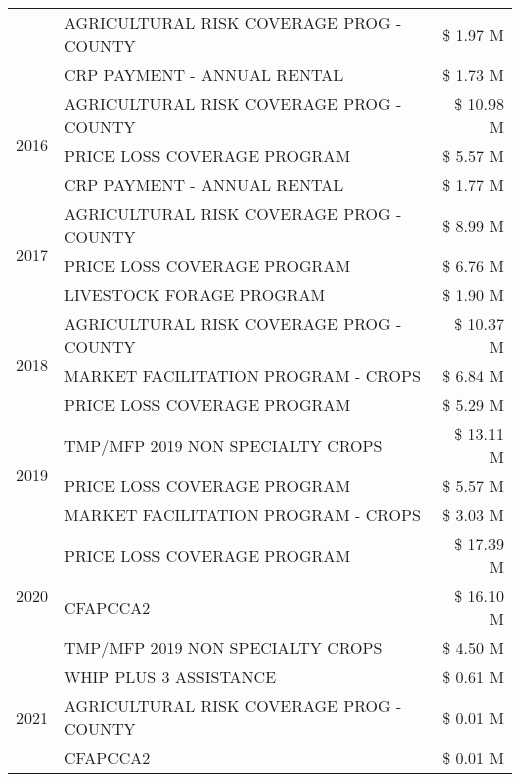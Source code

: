 \begin{tabular}{llr}
 & AGRICULTURAL RISK COVERAGE PROG - COUNTY & \$ 1.97 M \\
 & CRP PAYMENT - ANNUAL RENTAL & \$ 1.73 M \\
\cline{1-3}
\multirow[t]{3}{*}{2016} & AGRICULTURAL RISK COVERAGE PROG - COUNTY & \$ 10.98 M \\
 & PRICE LOSS COVERAGE PROGRAM & \$ 5.57 M \\
 & CRP PAYMENT - ANNUAL RENTAL & \$ 1.77 M \\
\cline{1-3}
\multirow[t]{3}{*}{2017} & AGRICULTURAL RISK COVERAGE PROG - COUNTY & \$ 8.99 M \\
 & PRICE LOSS COVERAGE PROGRAM & \$ 6.76 M \\
 & LIVESTOCK FORAGE PROGRAM & \$ 1.90 M \\
\cline{1-3}
\multirow[t]{3}{*}{2018} & AGRICULTURAL RISK COVERAGE PROG - COUNTY & \$ 10.37 M \\
 & MARKET FACILITATION PROGRAM - CROPS & \$ 6.84 M \\
 & PRICE LOSS COVERAGE PROGRAM & \$ 5.29 M \\
\cline{1-3}
\multirow[t]{3}{*}{2019} & TMP/MFP 2019 NON SPECIALTY CROPS & \$ 13.11 M \\
 & PRICE LOSS COVERAGE PROGRAM & \$ 5.57 M \\
 & MARKET FACILITATION PROGRAM - CROPS & \$ 3.03 M \\
\cline{1-3}
\multirow[t]{3}{*}{2020} & PRICE LOSS COVERAGE PROGRAM & \$ 17.39 M \\
 & CFAPCCA2 & \$ 16.10 M \\
 & TMP/MFP 2019 NON SPECIALTY CROPS & \$ 4.50 M \\
\cline{1-3}
\multirow[t]{3}{*}{2021} & WHIP PLUS 3 ASSISTANCE & \$ 0.61 M \\
 & AGRICULTURAL RISK COVERAGE PROG - COUNTY & \$ 0.01 M \\
 & CFAPCCA2 & \$ 0.01 M \\
\cline{1-3}
\bottomrule
\end{tabular}
